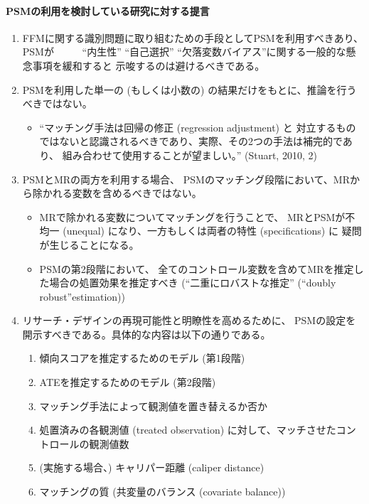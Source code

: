 \paragraph{PSMの利用を検討している研究に対する提言}
\begin{enumerate}
 \item FFMに関する識別問題に取り組むための手段としてPSMを利用すべきあり、PSMが
       ``内生性'' ``自己選択'' ``欠落変数バイアス''に関する一般的な懸念事項を緩和すると
       示唆するのは避けるべきである。
 \item PSMを利用した単一の (もしくは小数の) の結果だけをもとに、推論を行うべきではない。
       \begin{itemize}
        \item ``マッチング手法は回帰の修正 (regression adjustment) と
              対立するものではないと認識されるべきであり、実際、その2つの手法は補完的であり、
              組み合わせて使用することが望ましい。'' (Stuart, 2010, 2)
       \end{itemize}
 \item PSMとMRの両方を利用する場合、
       PSMのマッチング段階において、MRから除かれる変数を含めるべきではない。
       \begin{itemize}
        \item MRで除かれる変数についてマッチングを行うことで、
              MRとPSMが不均一 (unequal) になり、一方もしくは両者の特性 (specifications) に
              疑問が生じることになる。
        \item PSMの第2段階において、
              全てのコントロール変数を含めてMRを推定した場合の処置効果を推定すべき (``二重にロバストな推定'' (``doubly robust''estimation))
       \end{itemize}
 \item リサーチ・デザインの再現可能性と明瞭性を高めるために、
       PSMの設定を開示すべきである。具体的な内容は以下の通りである。
       \begin{enumerate}
        \item 傾向スコアを推定するためのモデル (第1段階)
        \item ATEを推定するためのモデル (第2段階)
        \item マッチング手法によって観測値を置き替えるか否か
        \item 処置済みの各観測値 (treated observation) に対して、マッチさせたコントロールの観測値数
        \item (実施する場合、) キャリパー距離 (caliper distance)
        \item マッチングの質 (共変量のバランス (covariate balance))
       \end{enumerate}
\end{enumerate}

